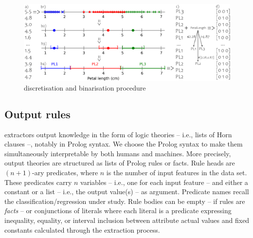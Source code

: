 \documentclass[12pt,a4paper,openright,twoside]{book}
\begin{document}
\begin{figure}
    \centering
    \includegraphics[width=\linewidth]{figures/disc.pdf}
    \caption{\psyke{} discretisation and binarisation procedure}
    \label{fig:discretisation}
\end{figure}

\subsection{Output rules}


\psyke{} extractors output knowledge in the form of logic theories -- i.e., lists of Horn clauses --, notably in Prolog syntax.
%
We choose the Prolog syntax to make them simultaneously interpretable by both humans and machines.
%
More precisely, \psyke{} output theories are structured as lists of Prolog rules or facts.
%
Rule heads are $(n+1)$-ary predicates, where $n$ is the number of input features in the data set.
%
These predicates carry $n$ variables -- i.e., one for each input feature -- and either a constant or a list -- i.e., the output value(s) -- as argument.
%
Predicate names recall the classification/regression under study.
%
Rule bodies can be empty -- if rules are \emph{facts} -- or conjunctions of literals where each literal is a predicate expressing inequality, equality, or interval inclusion between attribute actual values and fixed constants calculated through the extraction process.
\end{document}
